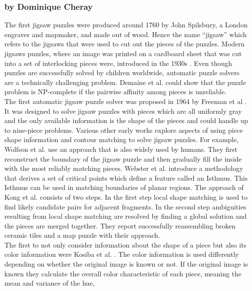 \documentclass[]{report}
\begin{document}
\subsubsection*{by Dominique Cheray}
The first jigsaw puzzles were produced around 1760 by John Spilsbury, a
London engraver and mapmaker, and made out of wood.
Hence the name ``jigsaw'' which refers to the jigsaws that were used to cut out
the pieces of the puzzles. Modern jigsaws puzzles, where an image was printed on
a cardboard sheet that was cut into a set of interlocking pieces were, introduced
in the 1930s \cite{williams2004jigsaw}. Even though puzzles are successfully
solved by children worldwide, automatic puzzle solvers are a technically
challenging problem. Demaine et al. \cite{demaine2007jigsaw} could show that the
puzzle problem is NP-complete if the pairwise affinity among pieces is
unreliable. \\
The first automatic jigsaw puzzle solver was proposed in 1964 by Freeman et al
\cite{freeman1964apictorial}. It was designed to solve jigsaw puzzles with
pieces which are all uniformly gray and the only available information is the
shape of the pieces and could handle up to nine-piece problems. Various other
early works explore aspects of using piece shape information and contour
matching to solve jigsaw puzzles. For example, Wolfson et al. \cite{wolfson1988solving}
use an approach that is also widely used by humans. They first reconstruct the boundary of
the jigsaw puzzle and then gradually fill the inside with the most reliably matching
pieces. Webster et al. \cite{webster1990computer} introduce a methodology that
derives a set of critical points which define a feature called an Isthmus. This
Isthmus can be used in matching boundaries of planar regions. The approach of
Kong et al. \cite{kong2001solving} consists of two steps. In the first step
local shape matching is used to find likely candidate pairs for adjacent
fragments. In the second step ambiguities resulting from local shape matching
are resolved by finding a global solution and the pieces are merged together.
They report successfully reassembling broken ceramic tiles and a map puzzle with
their approach. \\
The first to not only consider information about the shape of a piece but also
its color information were Kosiba et al. \cite{kosiba1994automatic}. The color
information is used differently depending on whether the original image is known
or not. If the original image is known they calculate the overall color
characteristic of each piece, meaning the mean and variance of the hue,
\end{document}

